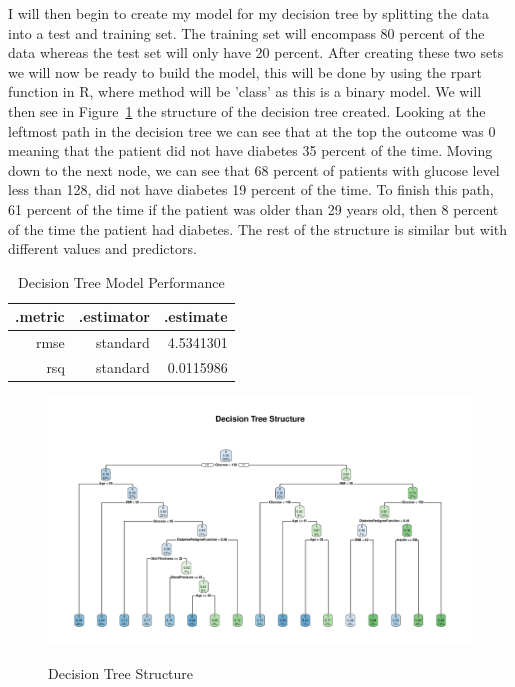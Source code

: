 \documentclass[12pt]{article}
\begin{document}
    I will then begin to create my model for my decision tree by
    splitting the data into a test and training set. The training set will encompass 80 percent of the data whereas the test set will
    only have 20 percent. After creating these two sets we will now be ready to build the model, this will be done by using the rpart
    function in R, where method will be 'class' as this is a binary model. We will then see in Figure~\ref{fig:structure} the structure
    of the decision tree created. Looking at the leftmost path in the decision tree we can see that at the top the outcome was 0 meaning 
    that the patient did not have diabetes 35 percent of the time. Moving down to the next node, we can see that 68 percent of patients with
    glucose level less than 128, did not have diabetes 19 percent of the time. To finish this path, 61 percent of the time if the patient was
    older than 29 years old, then 8 percent of the time the patient had diabetes. The rest of the structure is similar but with different 
    values and predictors.

\begin{table}[ht]
  \centering
  \caption{Decision Tree Model Performance} 
    \begin{tabular}{rrr}
    \toprule
    .metric & .estimator & .estimate\\ 
    \midrule
  rmse & standard & 4.5341301\\
  rsq & standard & 0.0115986\\
    \bottomrule
  \end{tabular}
  \label{tab:mp}
  \end{table}

\begin{figure}[tbp]
  \centering
  \caption{Decision Tree Structure}
  \includegraphics[width=\textwidth]{Decision Tree Structure.pdf}
  \label{fig:structure}
  \end{figure}
\end{document}

